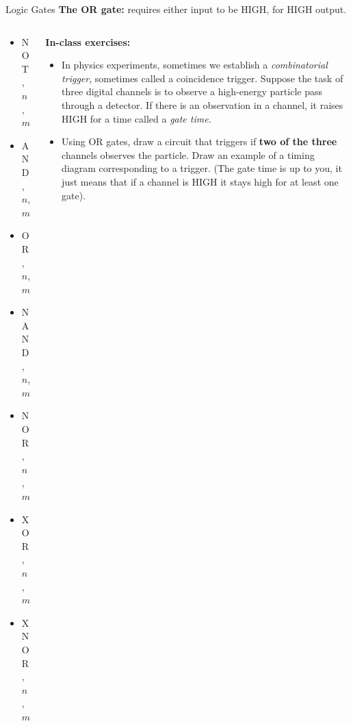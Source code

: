 \documentclass{beamer}
\begin{document}
\begin{frame}{Logic Gates}
\textbf{The OR gate:} requires either input to be HIGH, for HIGH output. \\ \vspace{0.5cm}
\begin{columns}[T]
\begin{column}{0.5\textwidth}
\begin{itemize}
\item \alert{NOT, $n=1$, $m=1$}
\item \alert{AND, $n$, $m=1$}
\item \alert{OR, $n$, $m=1$}
\item NAND, $n$, $m=1$
\item NOR, $n=2$, $m=1$
\item XOR, $n=2$, $m=1$
\item XNOR, $n=2$, $m=1$
\end{itemize}
\end{column}
\begin{column}{0.5\textwidth}
\tiny
\textbf{In-class exercises:}
\begin{itemize}
\item In physics experiments, sometimes we establish a \textit{combinatorial trigger}, sometimes called a coincidence trigger.  Suppose the task of three digital channels is to observe a high-energy particle pass through a detector.  If there is an observation in a channel, it raises HIGH for a time called a \textit{gate time.}
\item Using OR gates, draw a circuit that triggers if \textbf{two of the three} channels observes the particle.  Draw an example of a timing diagram corresponding to a trigger. (The gate time is up to you, it just means that if a channel is HIGH it stays high for at least one gate).
\end{itemize}
\end{column}
\end{columns}
\end{frame}
\end{document}
